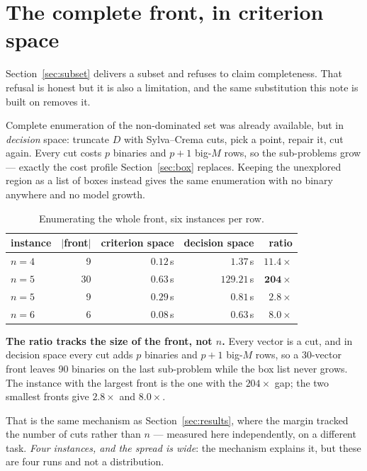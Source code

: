\documentclass[11pt,a4paper]{article}
\newcommand{\Dset}{D}
\begin{document}
\section{The complete front, in criterion space}
\label{sec:front}

Section~\ref{sec:subset} delivers a subset and refuses to claim completeness.
That refusal is honest but it is also a limitation, and the same substitution
this note is built on removes it.

Complete enumeration of the non-dominated set was already available, but in
\emph{decision} space: truncate $\Dset$ with Sylva--Crema cuts, pick a point,
repair it, cut again.  Every cut costs $p$ binaries and $p+1$ big-$M$ rows, so
the sub-problems grow --- exactly the cost profile Section~\ref{sec:box}
replaces.  Keeping the unexplored region as a list of boxes instead gives the
same enumeration with no binary anywhere and no model growth.

\begin{table}[h]
\centering
\caption{Enumerating the whole front, six instances per row.}
\begin{tabular}{lrrrr}
\toprule
instance & $|$front$|$ & criterion space & decision space & ratio \\
\midrule
$n=4$ &  9 & $0.12$\,s & $1.37$\,s   & $11.4\times$ \\
$n=5$ & 30 & $0.63$\,s & $129.21$\,s & $\mathbf{204\times}$ \\
$n=5$ &  9 & $0.29$\,s & $0.81$\,s   & $2.8\times$ \\
$n=6$ &  6 & $0.08$\,s & $0.63$\,s   & $8.0\times$ \\
\bottomrule
\end{tabular}
\end{table}

\noindent
\textbf{The ratio tracks the size of the front, not $n$.}  Every vector is a
cut, and in decision space every cut adds $p$ binaries and $p+1$ big-$M$ rows,
so a 30-vector front leaves 90 binaries on the last sub-problem while the box
list never grows.  The instance with the largest front is the one with the
$204\times$ gap; the two smallest fronts give $2.8\times$ and $8.0\times$.

That is the same mechanism as Section~\ref{sec:results}, where the margin
tracked the number of cuts rather than $n$ --- measured here independently, on
a different task.  \emph{Four instances, and the spread is wide}: the mechanism
explains it, but these are four runs and not a distribution.
\end{document}
